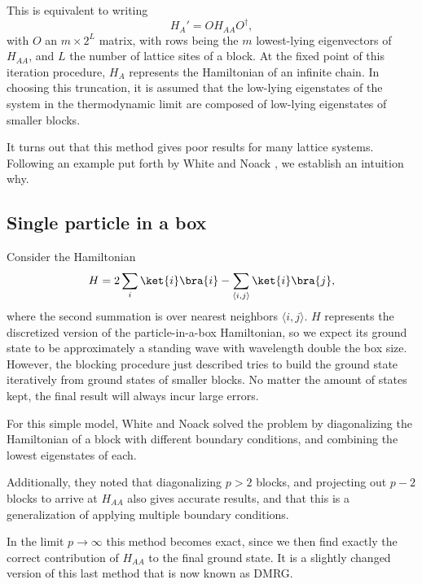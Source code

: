 This is equivalent to writing
\begin{equation}
  H_{A}' = O H_{AA} O^{\dagger},
\end{equation}
with $O$ an $m \times 2^L$ matrix, with rows being the $m$ lowest-lying
eigenvectors of $H_{AA}$, and $L$ the number of lattice sites of a block. At
the fixed point of this iteration procedure, $H_A$ represents the
Hamiltonian of an infinite chain.  In choosing this truncation, it is assumed that the
low-lying eigenstates of the system in the thermodynamic limit are
composed of low-lying eigenstates of smaller blocks.

It turns out that this method gives poor results for many lattice systems. Following an
example put forth by White and Noack \cite{white1992real}, we establish an intuition
why.

\subsection{Single particle in a box}

Consider the Hamiltonian
\begin{equation}
  H = 2 \sum_i \ket{i}\bra{i} - \sum_{\langle i, j \rangle} \ket{i}\bra{j},
\end{equation}
where the second summation is over nearest neighbors $\langle i,
j \rangle$. $H$ represents the discretized version of the
particle-in-a-box Hamiltonian, so we expect its ground state to be
approximately a standing wave with wavelength double the box size.
However, the blocking procedure just described tries to build the ground
state iteratively from ground states of smaller blocks. No matter the
amount of states kept, the final result will always incur large errors.

For this simple model, White and Noack solved the problem by diagonalizing
the Hamiltonian of a block with different boundary conditions, and
combining the lowest eigenstates of each.

Additionally, they noted that
diagonalizing $p > 2$ blocks, and projecting out $p - 2$ blocks to arrive
at $H_{AA}$ also gives accurate results, and that this is a generalization
of applying multiple boundary conditions. 

In the limit $p \to \infty$
this method becomes exact, since we then find exactly the correct
contribution of $H_{AA}$ to the final ground state. It is a slightly
changed version of this last method that is now known as DMRG.

